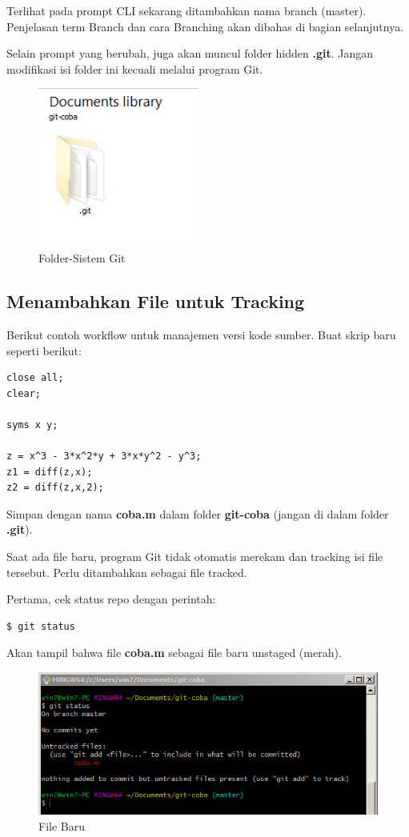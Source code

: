\documentclass[12pt]{book}
\begin{document}
	Terlihat pada prompt CLI sekarang ditambahkan nama branch (master).
	Penjelasan term Branch dan cara Branching akan dibahas di bagian selanjutnya.
	
	\newpage
	Selain prompt yang berubah, juga akan muncul folder hidden \textbf{.git}.
	Jangan modifikasi isi folder ini kecuali melalui program Git.
	
	\begin{figure}[!ht]
		\centering
		\includegraphics[width=150pt]{images/git2}
		\caption{Folder-Sistem Git}
	\end{figure}
	
	\subsection{Menambahkan File untuk Tracking}
	
	Berikut contoh workflow untuk manajemen versi kode sumber.
	Buat skrip baru seperti berikut:
	\begin{verbatim}
close all;
clear;

syms x y;

z = x^3 - 3*x^2*y + 3*x*y^2 - y^3;
z1 = diff(z,x);
z2 = diff(z,x,2);
	\end{verbatim}

	Simpan dengan nama \textbf{coba.m} dalam folder \textbf{git-coba} (jangan di dalam folder \textbf{.git}).
	
	Saat ada file baru, program Git tidak otomatis merekam dan tracking isi file tersebut.
	Perlu ditambahkan sebagai file tracked.
	
	Pertama, cek status repo dengan perintah:
	\begin{verbatim}
$ git status
	\end{verbatim}

	Akan tampil bahwa file \textbf{coba.m} sebagai file baru unstaged (merah).
	
	\begin{figure}[!ht]
		\centering
		\includegraphics[width=400pt]{images/git3}
		\caption{File Baru}
	\end{figure}
\end{document}
